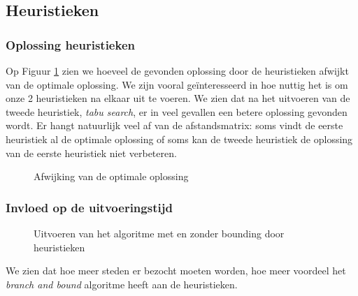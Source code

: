 \documentclass[12pt]{article}
\begin{document}
\subsection{Heuristieken}
\subsubsection{Oplossing heuristieken}
Op Figuur \ref{afwijking} zien we hoeveel de gevonden oplossing door de heuristieken afwijkt van de optimale oplossing. We zijn vooral ge\"interesseerd in hoe nuttig het is om onze 2 heuristieken na elkaar uit te voeren.  We zien dat na het uitvoeren van de tweede heuristiek, \textit{tabu search}, er in veel gevallen een betere oplossing gevonden wordt. Er hangt natuurlijk veel af van de afstandsmatrix: soms vindt de eerste heuristiek al de optimale oplossing of soms kan de tweede heuristiek de oplossing van de eerste heuristiek niet verbeteren.
\begin{figure}[H]
  \begin{center}
    
    \caption{Afwijking van de optimale oplossing}
    \label{afwijking}
  \end{center}
\end{figure}
\subsubsection{Invloed op de uitvoeringstijd}
\begin{figure}[H]
  \begin{center}
    
    \caption{Uitvoeren van het algoritme met en zonder bounding door heuristieken}
    \label{metzonderheuristieken}
  \end{center}
\end{figure}
We zien dat hoe meer steden er bezocht moeten worden, hoe meer voordeel het \textit{branch and bound} algoritme heeft aan de heuristieken.
\end{document}
